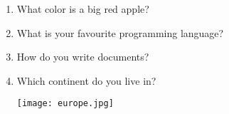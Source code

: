 \documentclass[12pt,onside,a4paper,article]{memoir}
\newcommand\blankpage{%
    \null
    \thispagestyle{empty}%
    \addtocounter{page}{-1}%
    \newpage}
\begin{document}
\clearpage\blankpage
\begin{enumerate}

\item{What color is a big red apple?}
\begin{flushright}
\end{flushright}
\item{What is your favourite programming language?}
\begin{flushright}
\end{flushright}
\item{How do you write documents?}
\begin{flushright}
\end{flushright}
\item{Which continent do you live in?}
\begin{flushright}
\end{flushright}
\begin{flushleft}
\texttt{[image: europe.jpg]}
\end{flushleft}
\end{enumerate}

\vspace*{4.5cm}
\begin{flushright}
 \end{flushright}
\end{document}

